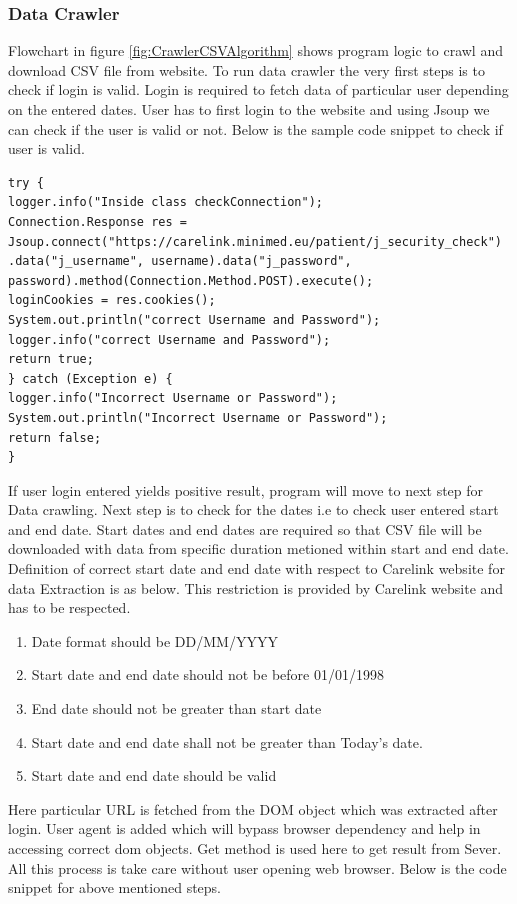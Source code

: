 \documentclass[article,type=msc,colorback,accentcolor=tud9c,twoside,11pt]{tudthesis}
\begin{document}
 
\subsubsection{Data Crawler}
\label{subsec:DataCrawler}
 Flowchart in figure \ref{fig:CrawlerCSVAlgorithm} shows program logic to crawl and download CSV file from website. To run data crawler the very first steps is to check if login is valid. Login is required to fetch data of particular user depending on the entered dates. User has to first login to the website and using Jsoup we can check if the user is valid or not. Below is the sample code snippet to check if user is valid.
\begin{lstlisting}
try {
logger.info("Inside class checkConnection");
Connection.Response res = Jsoup.connect("https://carelink.minimed.eu/patient/j_security_check")
.data("j_username", username).data("j_password", password).method(Connection.Method.POST).execute();
loginCookies = res.cookies();
System.out.println("correct Username and Password");
logger.info("correct Username and Password");
return true;
} catch (Exception e) {
logger.info("Incorrect Username or Password");
System.out.println("Incorrect Username or Password");
return false;
}
\end{lstlisting}
If user login entered yields positive result, program will move to next step for Data crawling. Next step is to check for the dates i.e to check user entered start and end date. Start dates and end dates are required so that CSV file will be downloaded with data from specific duration metioned within start and end date. Definition of correct start date and end date with respect to Carelink website for data Extraction is as below. This restriction is provided by Carelink website and has to be respected.
\begin{enumerate}
\item Date format should be DD/MM/YYYY
\item Start date and end date should not be before 01/01/1998
\item End date should not be greater than start date
\item Start date and end date shall not be greater than Today's date.
\item Start date and end date should be valid
\end{enumerate}
\clearpage

Here particular URL is fetched from the DOM object which was extracted after login. User agent is added which will bypass browser dependency and help in accessing correct dom objects. Get method is used here to get result from Sever. All this process is take care without user opening web browser. Below is the code snippet for above mentioned steps. 
\end{document}
